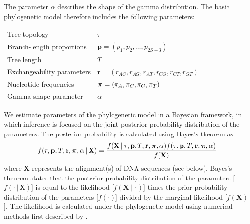 \documentclass[11pt]{article}
\newcommand{\given}{\ensuremath{\,|\,}}
\begin{document}
The parameter $\alpha$ describes the shape of the gamma distribution.
The basic phylogenetic model therefore includes the following parameters:
\begin{center}
\begin{tabular}{ll}
Tree topology              & $\tau$ \\
Branch-length proportions  & ${\mathbf p} = (p_1, p_2, \ldots, p_{2S-3})$ \\
Tree length                & $T$ \\
Exchangeability parameters & ${\mathbf r} = (r_{AC}, r_{AG}, r_{AT}, r_{CG}, r_{CT}, r_{GT})$ \\
Nucleotide frequencies     & $\mbox{\boldmath$\pi$\unboldmath} = (\pi_A, \pi_C, \pi_G, \pi_T)$ \\
Gamma-shape parameter      & $\alpha$
\end{tabular}
\end{center}

We estimate parameters of the phylogenetic model in a Bayesian framework, in which inference is focused on the joint posterior probability distribution of the parameters.
The posterior probability is calculated using Bayes's theorem as
\begin{align}
f(\tau, {\mathbf p}, T, {\mathbf r}, \mbox{\boldmath$\pi$\unboldmath}, \alpha \given {\mathbf X}) = {
f({\mathbf X} \given \tau, {\mathbf p}, T, {\mathbf r}, \mbox{\boldmath$\pi$\unboldmath}, \alpha)
f(\tau, {\mathbf p}, T, {\mathbf r}, \mbox{\boldmath$\pi$\unboldmath}, \alpha)
\over f({\mathbf X})}
\end{align}
where ${\mathbf X}$ represents the alignment(s) of DNA sequences (see below).
Bayes's theorem states that the posterior probability distribution of the parameters [$f(\cdot \given {\mathbf X})$] is equal to the likelihood [$f({\mathbf X} \given \cdot)$]
times the prior probability distribution of the parameters [$f(\cdot)$] divided by the marginal likelihood [$f({\mathbf X})$].
The likelihood is calculated under the phylogenetic model using numerical methods first described by \citet{felsenstein81}.
\end{document}
